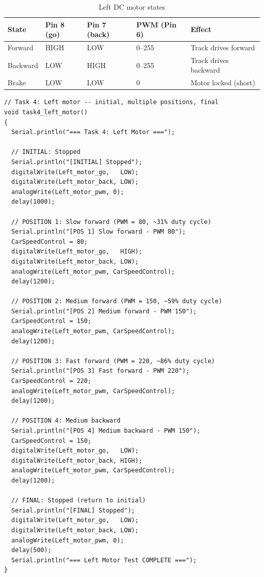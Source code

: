 \documentclass[12pt,a4paper]{article}
\begin{document}
\vspace{6pt}
\begin{table}[h!]
\centering
\caption{Left DC motor states}
\renewcommand{\arraystretch}{1.3}
\begin{tabularx}{\linewidth}{L{2.5cm} C{2.5cm} C{2.5cm} C{2.5cm} L{3cm}}
\toprule
{}
\color{white}\textbf{State} &
\color{white}\textbf{Pin 8 (go)} &
\color{white}\textbf{Pin 7 (back)} &
\color{white}\textbf{PWM (Pin 6)} &
\color{white}\textbf{Effect} \\
\midrule
Forward & HIGH & LOW & 0--255 & Track drives forward \\
Backward & LOW & HIGH & 0--255 & Track drives backward \\
Brake & LOW & LOW & 0 & Motor locked (short) \\
\bottomrule
\end{tabularx}
\end{table}

\begin{lstlisting}[style=arduino,caption={Task 4 --- Left motor position/state test}]
// Task 4: Left motor -- initial, multiple positions, final
void task4_left_motor()
{
  Serial.println("=== Task 4: Left Motor ===");

  // INITIAL: Stopped
  Serial.println("[INITIAL] Stopped");
  digitalWrite(Left_motor_go,   LOW);
  digitalWrite(Left_motor_back, LOW);
  analogWrite(Left_motor_pwm, 0);
  delay(1000);

  // POSITION 1: Slow forward (PWM = 80, ~31% duty cycle)
  Serial.println("[POS 1] Slow forward - PWM 80");
  CarSpeedControl = 80;
  digitalWrite(Left_motor_go,   HIGH);
  digitalWrite(Left_motor_back, LOW);
  analogWrite(Left_motor_pwm, CarSpeedControl);
  delay(1200);

  // POSITION 2: Medium forward (PWM = 150, ~59% duty cycle)
  Serial.println("[POS 2] Medium forward - PWM 150");
  CarSpeedControl = 150;
  analogWrite(Left_motor_pwm, CarSpeedControl);
  delay(1200);

  // POSITION 3: Fast forward (PWM = 220, ~86% duty cycle)
  Serial.println("[POS 3] Fast forward - PWM 220");
  CarSpeedControl = 220;
  analogWrite(Left_motor_pwm, CarSpeedControl);
  delay(1200);

  // POSITION 4: Medium backward
  Serial.println("[POS 4] Medium backward - PWM 150");
  CarSpeedControl = 150;
  digitalWrite(Left_motor_go,   LOW);
  digitalWrite(Left_motor_back, HIGH);
  analogWrite(Left_motor_pwm, CarSpeedControl);
  delay(1200);

  // FINAL: Stopped (return to initial)
  Serial.println("[FINAL] Stopped");
  digitalWrite(Left_motor_go,   LOW);
  digitalWrite(Left_motor_back, LOW);
  analogWrite(Left_motor_pwm, 0);
  delay(500);
  Serial.println("=== Left Motor Test COMPLETE ===");
}
\end{lstlisting}
\end{document}

